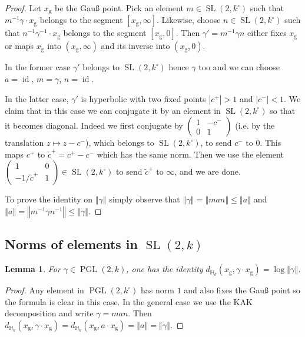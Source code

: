 \documentclass[10pt]{amsart}
\newtheorem{lemm}[theo]{Lemma}\newtheorem{prop}[theo]{Proposition}\newtheorem{coro}[theo]{Corollary}\newtheorem{conj}[theo]{Conjecture}
\theoremstyle{definition}\newtheorem{defi}[theo]{Definition}\newtheorem{rema}[theo]{Remark}\newtheorem{exam}[theo]{Example}\newtheorem{exem}[theo]{Example}\newtheorem{nota}[theo]{Notation}
\DeclareMathOperator{\id}{id}
\DeclareMathOperator{\SL}{SL}
\DeclareMathOperator{\PGL}{PGL}
\newcommand{\hh}{\mathbb{H}}
\newcommand{\norm}[1]{\left\Vert#1\right\Vert}
\newcommand{\lrpar}[1]{\left(#1\right)}
\newcommand{\SLk}{\SL(2,k)}
\newcommand{\PGLk}{\PGL(2, k)}
\begin{document}
\begin{proof}
Let $x_{\mathrm{g}}$ be the Gau{\ss} point. Pick an element $m\in \SL(2,k^\circ)$ such that $m^{-1} \gamma\cdot x_{\mathrm{g}}$ belongs to the segment $[x_{\mathrm{g}}, \infty]$. Likewise, choose $n\in \SL(2,k^\circ)$ such that $n^{-1} \gamma^{-1} \cdot x_{\mathrm{g}}$ belongs to the segment $[x_{\mathrm{g}}, 0]$. Then $\gamma' = m^{-1} \gamma n$ either fixes $x_{\mathrm{g}}$ or maps $x_{\mathrm{g}}$ into $(x_{\mathrm{g}}, \infty)$ and its inverse into $(x_{\mathrm{g}},0)$.

In the former case $\gamma'$ belongs to $\SL(2,k^\circ)$ hence $\gamma$ too and we can choose $a = \id$, $m = \gamma$, $n=\id$.

In the latter case, $\gamma'$ is hyperbolic with two fixed points $|c^+| >1$ and $|c^-|<1$. We claim that in this case we can conjugate it by an element in $\SL(2,k^\circ)$ so that it becomes diagonal. Indeed we first conjugate by $\lrpar{
\begin{smallmatrix}
1 & -c^- \\ 0 & 1
\end{smallmatrix}}$ (i.e. by the translation $z\mapsto z-c^-$), which belongs to $\SL(2,k^\circ)$, to send $c^-$ to 0. This maps $c^+$ to $ \tilde c^+ = c^+ - c^-$ which has the same norm. Then we use the element $\lrpar{
\begin{smallmatrix}
1 & 0\\ -1/\tilde c^+ & 1
\end{smallmatrix}}\in \SL(2,k^\circ)$ to send $ \tilde c^+$ to $\infty$, and we are done.

To prove the identity on $\norm{\gamma}$ simply observe that $\norm{\gamma} = \norm{man} \le \norm{a}$ and $ \norm{a} = \norm{m^{-1} \gamma n^{-1}} \le \norm{\gamma}$.
\end{proof}

\subsection{Norms of elements in \texorpdfstring{$\SLk$}{SLk}}

\begin{lemm}
For $\gamma\in \PGLk$, one has the identity $d_{\hh_k}(x_{\mathrm{g}}, \gamma\cdot x_{\mathrm{g}}) = \log \norm{\gamma}$.
\end{lemm}

\begin{proof}
Any element in $\PGL(2,k^\circ)$ has norm $1$ and also fixes the Gau{\ss} point so the formula is clear in this case. In the general case we use the KAK decomposition and write $\gamma = man$. Then $d_{\hh_k}(x_{\mathrm{g}}, \gamma\cdot x_{\mathrm{g}}) = d_{\hh_k}(x_{\mathrm{g}}, a \cdot x_{\mathrm{g}}) = \norm{a}=\norm{\gamma}$.
\end{proof}
\end{document}

